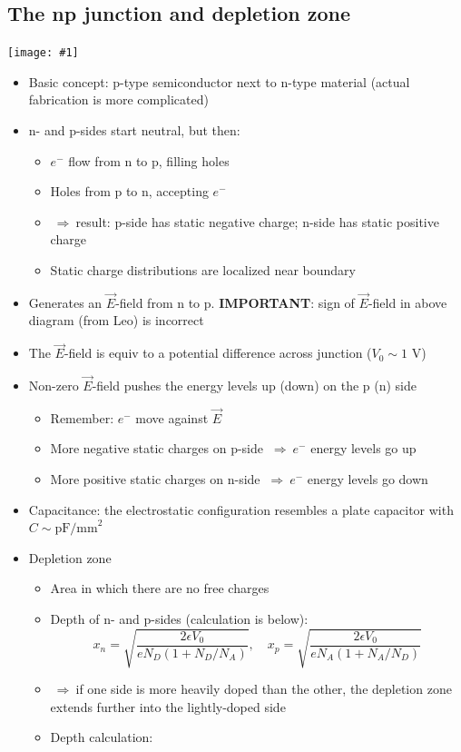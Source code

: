 \documentclass[11pt]{article}
\newcommand{\E}{\ensuremath{\vec{E}}}
\newcommand{\el}{\ensuremath{e^{-}}\xspace}
\newcommand{\thus}{$~\Rightarrow~$}
\newcommand{\embedimgw}[2]{\begin{center}\texttt{[image: \#1]}\end{center}}
\begin{document}
\subsection{The np junction and depletion zone}
\embedimgw{figs/npjunc.png}{.8}
\begin{itemize}
  \item Basic concept: p-type semiconductor next to n-type material (actual fabrication is more complicated)
  \item n- and p-sides start neutral, but then:
  \begin{itemize}
    \item \el flow from n to p, filling holes
    \item Holes from p to n, accepting \el
    \item \thus result: p-side has static negative charge; n-side has static positive charge
    \item Static charge distributions are localized near boundary
  \end{itemize}
  \item Generates an \E-field from n to p. {\bf IMPORTANT}: sign of \E-field in above diagram (from Leo) is incorrect
  \item The \E-field is equiv to a potential difference across junction ($V_0 \sim 1$ V)
  \item Non-zero \E-field pushes the energy levels up (down) on the p (n) side
  \begin{itemize}
    \item Remember: \el move against \E
    \item More negative static charges on p-side \thus \el energy levels go up
    \item More positive static charges on n-side \thus \el energy levels go down
  \end{itemize}
  \item Capacitance: the electrostatic configuration resembles a plate capacitor with $C\sim \text{pF/mm}^2$
  \item Depletion zone
  \begin{itemize}
    \item Area in which there are no free charges
    \item Depth of n- and p-sides (calculation is below):
    \begin{equation}
      x_n = \sqrt{\frac{2\epsilon V_0}{e N_D(1+N_D/N_A)}}, \quad x_p = \sqrt{\frac{2\epsilon V_0}{eN_A(1+N_A/N_D)}}
    \end{equation}
    \item \thus if one side is more heavily doped than the other, the depletion zone extends further into the lightly-doped side
    \item Depth calculation:
  \end{itemize}
\end{itemize}
\end{document}
